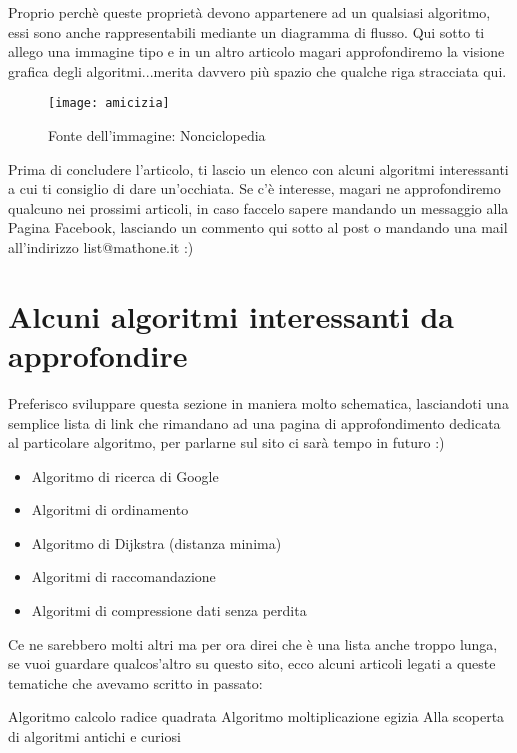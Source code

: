 Proprio perchè queste proprietà devono appartenere ad un qualsiasi algoritmo, essi sono anche rappresentabili mediante un diagramma di flusso. Qui sotto ti allego una immagine tipo e in un altro articolo magari approfondiremo la visione grafica degli algoritmi...merita davvero più spazio che qualche riga stracciata qui.

\begin{figure*}
	\texttt{[image: amicizia]}
	\caption{Fonte dell'immagine: Nonciclopedia}
\end{figure*}

Prima di concludere l'articolo, ti lascio un elenco con alcuni algoritmi interessanti a cui ti consiglio di dare un'occhiata. Se c'è interesse, magari ne approfondiremo qualcuno nei prossimi articoli, in caso faccelo sapere mandando un messaggio alla Pagina Facebook, lasciando un commento qui sotto al post o mandando una mail all'indirizzo list@mathone.it :)

\section{Alcuni algoritmi interessanti da approfondire}

Preferisco sviluppare questa sezione in maniera molto schematica, lasciandoti una semplice lista di link che rimandano ad una pagina di approfondimento dedicata al particolare algoritmo, per parlarne sul sito ci sarà tempo in futuro :)

\begin{itemize}
	\item Algoritmo di ricerca di Google
	\item Algoritmi di ordinamento
	\item Algoritmo di Dijkstra (distanza minima)
	\item Algoritmi di raccomandazione
	\item Algoritmi di compressione dati senza perdita
\end{itemize}

Ce ne sarebbero molti altri ma per ora direi che è una lista anche troppo lunga, se vuoi guardare qualcos'altro su questo sito, ecco alcuni articoli legati a queste tematiche che avevamo scritto in passato:

Algoritmo calcolo radice quadrata
Algoritmo moltiplicazione egizia
Alla scoperta di algoritmi antichi e curiosi